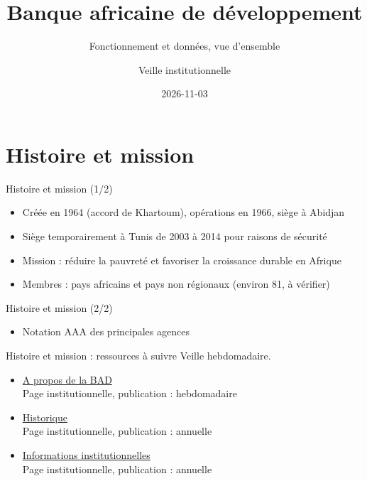 \documentclass[aspectratio=169,11pt]{beamer}
\title{Banque africaine de développement}
\subtitle{Fonctionnement et données, vue d'ensemble}
\author{Veille institutionnelle}
\date{2026-11-03}
\begin{document}
\begin{frame}\titlepage\end{frame}

\section{Histoire et mission}
\begin{frame}{Histoire et mission (1/2)}
\begin{itemize}
\item Créée en 1964 (accord de Khartoum), opérations en 1966, siège à Abidjan
\item Siège temporairement à Tunis de 2003 à 2014 pour raisons de sécurité
\item Mission : réduire la pauvreté et favoriser la croissance durable en Afrique
\item Membres : pays africains et pays non régionaux (environ 81, à vérifier)
\end{itemize}
\end{frame}

\begin{frame}{Histoire et mission (2/2)}
\begin{itemize}
\item Notation AAA des principales agences
\end{itemize}
\end{frame}

\begin{frame}{Histoire et mission : ressources à suivre}
\small
Veille hebdomadaire.
\begin{itemize}
\item \href{https://www.afdb.org/en/about-us}{A propos de la BAD}\\{\footnotesize Page institutionnelle, publication : hebdomadaire}
\item \href{https://www.afdb.org/en/about-us/history}{Historique}\\{\footnotesize Page institutionnelle, publication : annuelle}
\item \href{https://www.afdb.org/en/about-us/corporate-information}{Informations institutionnelles}\\{\footnotesize Page institutionnelle, publication : annuelle}
\end{itemize}
\end{frame}
\end{document}
